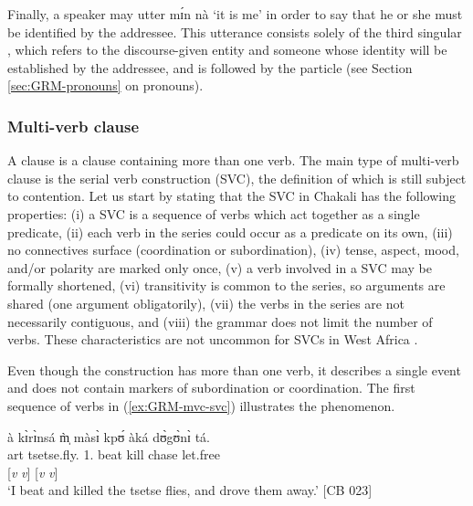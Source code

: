 Finally, a speaker may utter {\sls mɪ́n nà} `it is me' in order to say that he or 
she must be identified by the addressee. This utterance consists solely of the third singular 
, which refers to the discourse-given entity and someone whose identity will be established by the addressee, and is followed by the  particle (see Section \ref{sec:GRM-pronouns} on pronouns).


\subsubsection{Multi-verb clause}
\label{sec:GRM-multi-verb-clause}

A  clause is a clause containing more than one verb. The main type of
multi-verb clause is the serial verb construction (SVC), the definition of which
is still subject to contention. Let us start by stating that the SVC in Chakali
has the following properties: (i) a SVC is a sequence of verbs which act
together as a single predicate, (ii) each verb in the series could occur as a
predicate on its own, (iii)  no connectives  surface (coordination or
subordination), (iv)  tense, aspect, mood, and/or polarity are marked only once,
(v)  a verb involved in a SVC may be formally shortened,  (vi)  transitivity is
common to the series, so arguments are shared (one argument obligatorily), (vii)
the verbs in the series are not necessarily contiguous, and  (viii) the grammar
does not limit the number of verbs. These characteristics are not uncommon for 
SVCs in West Africa \citep{Amek05a}. 


Even though the construction has more than one
verb, it describes a single event and does not contain  markers of
subordination or coordination. The first sequence of verbs in
(\ref{ex:GRM-mvc-svc}) illustrates the phenomenon.



\ea\label{ex:GRM-mvc-svc}
\glll à  kɪ̀rɪ̀nsá   m̩̀   màsɪ̀   kpʊ́ àká dʊ̀gʊ̀nɪ̀ tá.\\
{\sc art}  tsetse.fly.{\pl}   {1.\sg}    beat   kill   {\conn} 
chase   let.free\\
 {} {} {}  [{\it v} {\it v}]  {} [{\it v} {\it v}]\\
\glt `I beat and killed the tsetse flies, and drove them away.' [CB 023]
\z

